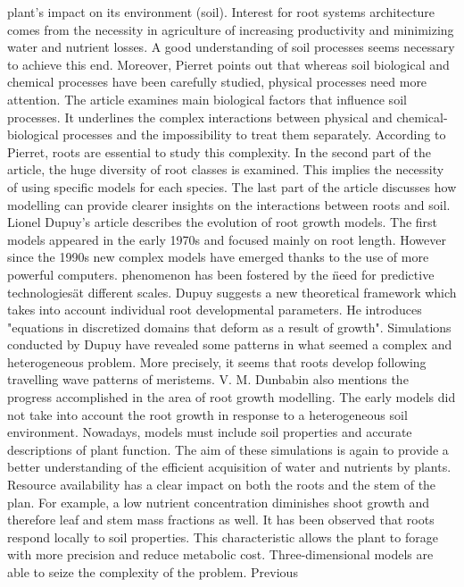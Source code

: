 plant’s impact on its environment (soil). Interest for root systems architecture comes
from the necessity in agriculture of increasing productivity and minimizing water and
nutrient losses. A good understanding of soil processes seems necessary to achieve this
end. Moreover, Pierret points out that whereas soil biological and chemical processes
have been carefully studied, physical processes need more attention. The article examines
main biological factors that influence soil processes. It underlines the complex interactions
between physical and chemical-biological processes and the impossibility to treat them
separately. According to Pierret, roots are essential to study this complexity. In the
second part of the article, the huge diversity of root classes is examined. This implies the
necessity of using specific models for each species. The last part of the article discusses
how modelling can provide clearer insights on the interactions between roots and soil.
\bigbreak
Lionel Dupuy’s article describes the evolution of root growth models. The first models
appeared in the early 1970s and focused mainly on root length. However since the 1990s
new complex models have emerged thanks to the use of more powerful computers.
phenomenon has been fostered by the \"need for predictive technologies\" at different scales.
Dupuy suggests a new theoretical framework which takes into account individual root
developmental parameters. He introduces "equations in discretized domains that deform
as a result of growth". Simulations conducted by Dupuy have revealed some patterns in
what seemed a complex and heterogeneous problem. More precisely, it seems that roots
develop following travelling wave patterns of meristems.
\bigbreak
V. M. Dunbabin also mentions the progress accomplished in the area of root growth
modelling. The early models did not take into account the root growth in response to
a heterogeneous soil environment. Nowadays, models must include soil properties and
accurate descriptions of plant function. The aim of these simulations is again to provide a better understanding of the efficient acquisition of water and nutrients by plants. Resource
availability has a clear impact on both the roots and the stem of the plan. For example,
a low nutrient concentration diminishes shoot growth and therefore leaf and stem mass
fractions as well. It has been observed that roots respond locally to soil properties. This
characteristic allows the plant to forage with more precision and reduce metabolic cost.
Three-dimensional models are able to seize the complexity of the problem. Previous

